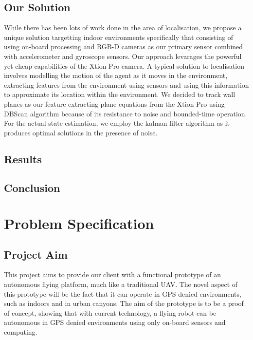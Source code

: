 \documentclass[]{article}
\begin{document}
{\subsection{Our Solution}
While there has been lots of work done in the area of localisation, we propose a unique solution targetting indoor environments specifically that consisting of using on-board processing and RGB-D cameras as our primary sensor combined with accelerometer and gyroscope sensors. Our approach levarages the powerful yet cheap capabilities of the Xtion Pro camera. A typical solution to localisation involves modelling the motion of the agent as it moves in the environment, extracting features from the environment using sensors and using this information to approximate its location within the environment. We decided to track wall planes as our feature extracting plane equations from the Xtion Pro using DBScan algorithm because of its resistance to noise and bounded-time operation. For the actual state estimation, we employ the kalman filter algorithm as it produces optimal solutions in the presence of noise.  
\subsection{Results}

\subsection{Conclusion}

\clearpage

\section{Problem Specification}
\label{sec:problem_specification}

\subsection{Project Aim}
\label{sub:what_are_we_trying_to_achieve}
\cite{OpenPilotinsgps}
This project aims to provide our client with a functional prototype of an autonomous flying platform, much like a traditional \ac{UAV}. The novel aspect of this prototype will be the fact that it can operate in \ac{GPS} denied environments, such as indoors and in urban canyons. The aim of the prototype is to be a proof of concept, showing that with current technology, a flying robot can be autonomous in \ac{GPS} denied environments using only on-board sensors and computing. 

}
\end{document}
